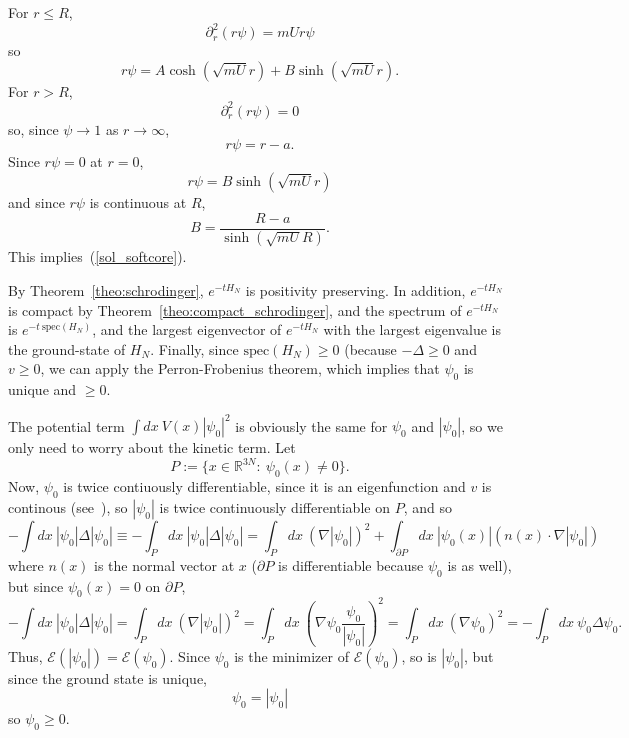 \documentclass{ian}
\begin{document}
For $r\leqslant R$,
\begin{equation}
  \partial_r^2(r\psi)=mUr\psi
\end{equation}
so
\begin{equation}
  r\psi=A\cosh(\sqrt{mU}r)+B\sinh(\sqrt{mU}r)
  .
\end{equation}
For $r>R$,
\begin{equation}
  \partial_r^2(r\psi)=0
\end{equation}
so, since $\psi\to1$ as $r\to\infty$,
\begin{equation}
  r\psi=r-a
  .
\end{equation}
Since $r\psi=0$ at $r=0$,
\begin{equation}
  r\psi=B\sinh(\sqrt{mU}r)
\end{equation}
and since $r\psi$ is continuous at $R$,
\begin{equation}
  B=\frac{R-a}{\sinh(\sqrt{mU}R)}
  .
\end{equation}
This implies\-~(\ref{sol_softcore}).
\bigskip

By Theorem\-~\ref{theo:schrodinger}, $e^{-tH_N}$ is positivity preserving.
In addition, $e^{-tH_N}$ is compact by Theorem\-~\ref{theo:compact_schrodinger}, and the spectrum of $e^{-tH_N}$ is $e^{-t\ \mathrm{spec}(H_N)}$, and the largest eigenvector of $e^{-tH_N}$ with the largest eigenvalue is the ground-state of $H_N$.
Finally, since $\mathrm{spec}(H_N)\geqslant 0$ (because $-\Delta\geqslant 0$ and $v\geqslant 0$, we can apply the Perron-Frobenius theorem, which implies that $\psi_0$ is unique and $\geqslant 0$.
\bigskip

The potential term $\int dx\ V(x)|\psi_0|^2$ is obviously the same for $\psi_0$ and $|\psi_0|$, so we only need to worry about the kinetic term.
Let
\begin{equation}
  P:=\{x\in\mathbb R^{3N}:\ \psi_0(x)\neq0\}
  .
\end{equation}
Now, $\psi_0$ is twice contiuously differentiable, since it is an eigenfunction and $v$ is continous (see\-~\cite[Theorem 11.7(vi)]{LL01}), so $|\psi_0|$ is twice continuously differentiable on $P$,  and so
\begin{equation}
  -\int dx\ |\psi_0|\Delta|\psi_0|
  \equiv
  -\int_P dx\ |\psi_0|\Delta|\psi_0|
  =
  \int_P dx\ (\nabla|\psi_0|)^2
  +\int_{\partial P} dx\ |\psi_0(x)|(n(x)\cdot\nabla|\psi_0|)
\end{equation}
where $n(x)$ is the normal vector at $x$ ($\partial P$ is differentiable because $\psi_0$ is as well), but since $\psi_0(x)=0$ on $\partial P$,
\begin{equation}
  -\int dx\ |\psi_0|\Delta|\psi_0|
  =
  \int_P dx\ (\nabla|\psi_0|)^2
  =
  \int_P dx\ \left(\nabla\psi_0\frac{\psi_0}{|\psi_0|}\right)^2
  =
  \int_P dx\ (\nabla\psi_0)^2
  =
  -\int_P dx\ \psi_0\Delta\psi_0
  .
\end{equation}
Thus, $\mathcal E(|\psi_0|)=\mathcal E(\psi_0)$.
Since $\psi_0$ is the minimizer of $\mathcal E(\psi_0)$, so is $|\psi_0|$, but since the ground state is unique,
\begin{equation}
  \psi_0=|\psi_0|
\end{equation}
so $\psi_0\geqslant 0$.
\bigskip
\end{document}
